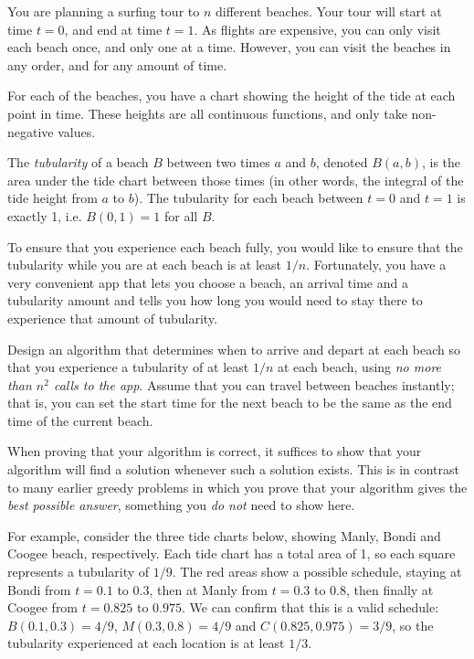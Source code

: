 \documentclass[12pt]{article}
\begin{document}

\begin{question} 
You are planning a surfing tour to $n$ different beaches. Your tour will start at time $t=0$, and end at time $t=1$. As flights are expensive, you can only visit each beach once, and only one at a time. However, you can visit the beaches in any order, and for any amount of time.

For each of the beaches, you have a chart showing the height of the tide at each point in time. These heights are all continuous functions, and only take non-negative values.

The \textit{tubularity} of a beach $B$ between two times $a$ and $b$, denoted $B(a, b)$, is the area under the tide chart between those times (in other words, the integral of the tide height from $a$ to $b$). The tubularity for each beach between $t=0$ and $t=1$ is exactly 1, i.e. $B(0, 1) = 1$ for all $B$.

To ensure that you experience each beach fully, you would like to ensure that the tubularity while you are at each beach is at least $1/n$. Fortunately, you have a very convenient app that lets you choose a beach, an arrival time and a tubularity amount and tells you how long you would need to stay there to experience that amount of tubularity.

Design an algorithm that determines when to arrive and depart at each beach so that you experience a tubularity of at least $1/n$ at each beach, using \emph{no more than $n^2$ calls to the app}. Assume that you can travel between beaches instantly; that is, you can set the start time for the next beach to be the same as the end time of the current beach.

When proving that your algorithm is correct, it suffices to show that your algorithm will find a solution whenever such a solution exists. This is in contrast to many earlier greedy problems in which you prove that your algorithm gives the \emph{best possible answer}, something you \emph{do not} need to show here.

For example, consider the three tide charts below, showing Manly, Bondi and Coogee beach, respectively. Each tide chart has a total area of 1, so each square represents a tubularity of $1/9$. The red areas show a possible schedule, staying at Bondi from $t=0.1$ to $0.3$, then at Manly from $t=0.3$ to $0.8$, then finally at Coogee from $t=0.825$ to $0.975$. We can confirm that this is a valid schedule: $B(0.1, 0.3) = 4/9$, $M(0.3,0.8) = 4/9$ and $C(0.825, 0.975) = 3/9$, so the tubularity experienced at each location is at least $1/3$.
\begin{center}
\end{center}
\end{question}
\end{document}
